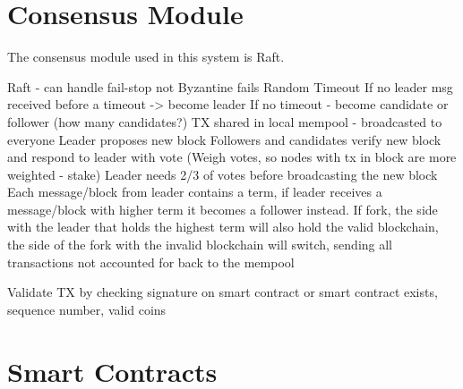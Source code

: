 \section{Consensus Module}
The consensus module used in this system is Raft. 

Raft - can handle fail-stop not Byzantine fails
Random Timeout
If no leader msg received before a timeout -> become leader
If no timeout - become candidate or follower (how many candidates?)
TX shared in local mempool - broadcasted to everyone
Leader proposes new block
Followers and candidates verify new block and respond to leader with vote
(Weigh votes, so nodes with tx in block are more weighted - stake)
Leader needs 2/3 of votes before broadcasting the new block
Each message/block from leader contains a term, if leader receives a message/block with higher term it becomes a follower instead. If fork, the side with the leader that holds the highest term will also hold the valid blockchain, the side of the fork with the invalid blockchain will switch, sending all transactions not accounted for back to the mempool

Validate TX by checking signature on smart contract or smart contract exists, sequence number, valid coins

\section{Smart Contracts}

